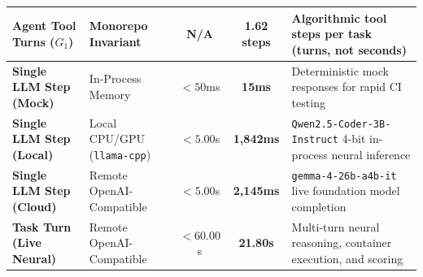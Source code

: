 \begin{table}[t]
\begin{tabular}{llccp{7.2cm}}
\midrule
\textbf{Agent Tool Turns ($G_1$)} & Monorepo Invariant & N/A & \textbf{1.62 steps} & Algorithmic tool steps per task (turns, not seconds) \\
\midrule
\textbf{Single LLM Step (Mock)} & In-Process Memory & $< 50$ms & \textbf{15ms} & Deterministic mock responses for rapid CI testing \\
\textbf{Single LLM Step (Local)} & Local CPU/GPU (\texttt{llama-cpp}) & $< 5.00$s & \textbf{1,842ms} & \texttt{Qwen2.5-Coder-3B-Instruct} 4-bit in-process neural inference \\
\textbf{Single LLM Step (Cloud)} & Remote OpenAI-Compatible & $< 5.00$s & \textbf{2,145ms} & \texttt{gemma-4-26b-a4b-it} live foundation model completion \\
\textbf{Task Turn (Live Neural)} & Remote OpenAI-Compatible & $< 60.00$s & \textbf{21.80s} & Multi-turn neural reasoning, container execution, and scoring \\
\bottomrule
\end{tabular}
\end{table}
